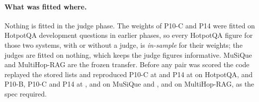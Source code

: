 \paragraph{What was fitted where.} Nothing is fitted in the judge phase. The weights of P10-C and
P14 were fitted on HotpotQA development questions in earlier phases, so every HotpotQA figure for
those two systems, with or without a judge, is \emph{in-sample} for their weights; the judges
are fitted on nothing, which keeps the judge figures informative. MuSiQue and MultiHop-RAG are the
frozen transfer. Before any pair was scored the code replayed the stored lists and reproduced
P10-C at \dThreePTenCHotpot{} and P14 at \dThreePFourteenHotpot{} on HotpotQA, and P10-B, P10-C and P14 at
\dThreePTenBMusique{}, \dThreePTenCMusique{} and \dThreePFourteenMusique{} on MuSiQue and \dThreePTenBMultihop{},
\dThreePTenCMultihop{} and \dThreePFourteenMultihop{} on MultiHop-RAG, as the spec required.
